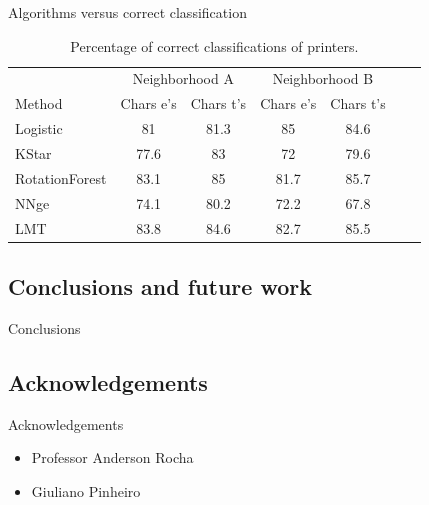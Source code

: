 \documentclass[notes]{beamer}
\begin{document}
\begin{frame}

\begin{block}{Algorithms versus correct classification}

\begin{table}
\label{tab:correct_classification}
\caption{Percentage of correct classifications of printers.}
\begin{center}
\begin{small} 
\setlength{\tabcolsep}{3pt} 
\begin{tabular}{l*{5}{c}r} & \multicolumn{2}{c}{Neighborhood A} & \multicolumn{2}{c}{Neighborhood B}\\ \cline{1-5}
Method & Chars e’s & Chars t’s & Chars e’s & Chars t’s \\
\hline
Logistic & 81 & 81.3 & 85 & 84.6\\
KStar & 77.6 & 83 & 72 & 79.6\\
RotationForest & 83.1 & 85 & 81.7 & 85.7\\
NNge & 74.1 & 80.2 & 72.2 & 67.8\\
LMT & 83.8 & 84.6 & 82.7 & 85.5\\

\end{tabular}
\end{small}
\end{center}
\end{table}

\end{block}

\end{frame}

\begin{frame}
\section{Conclusions and future work}

\begin{block}{Conclusions}

\end{block}

\end{frame}

\begin{frame}
\section{Acknowledgements}

\begin{block}{Acknowledgements}

\begin{itemize}

\item Professor Anderson Rocha

\item Giuliano Pinheiro

\end{itemize}

\end{block}

\end{frame}
\end{document}
